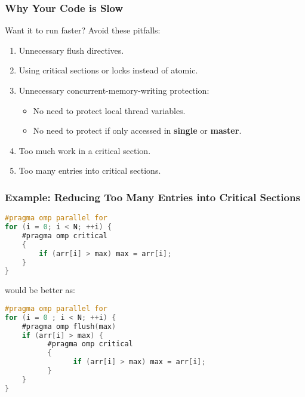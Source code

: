 \begin{frame}
  \frametitle{Why Your Code is Slow}

  \begin{changemargin}{1cm}
  \large
  Want it to run faster? Avoid these pitfalls:\\
  \begin{enumerate}
    \item Unnecessary flush directives.
    \item Using critical sections or locks instead of atomic.
    \item Unnecessary concurrent-memory-writing protection:
      \begin{itemize}
        \item No need to protect local thread variables.
        \item No need to protect if only accessed in {\bf single} or
          {\bf master}.
      \end{itemize}
    \item Too much work in a critical section.
    \item Too many entries into critical sections.
  \end{enumerate}
  \end{changemargin}
  
\end{frame}

\begin{frame}[fragile]
  \frametitle{Example: Reducing Too Many Entries into Critical Sections}

  \begin{changemargin}{1cm}
  \large
  \begin{lstlisting}[language=C,morekeywords={foreach,pragma,omp,parallel,single,nowait,task,untied,barrier,taskyield,mergeable,final,taskwait,critical}]
#pragma omp parallel for
for (i = 0; i < N; ++i) { 
    #pragma omp critical
    {
        if (arr[i] > max) max = arr[i];
    } 
}
  \end{lstlisting}

would be better as:

  \begin{lstlisting}[language=C,morekeywords={foreach,pragma,omp,parallel,single,nowait,task,untied,barrier,taskyield,mergeable,final,taskwait,critical}]
#pragma omp parallel for
for (i = 0 ; i < N; ++i) { 
    #pragma omp flush(max)
    if (arr[i] > max) {
          #pragma omp critical
          {
                if (arr[i] > max) max = arr[i];
          }
    }
}
  \end{lstlisting}
  \end{changemargin}
  
\end{frame}

